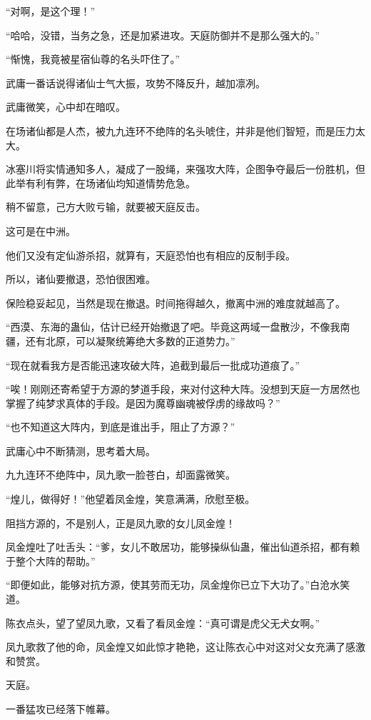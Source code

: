 \begin{this_body}
“对啊，是这个理！”

“哈哈，没错，当务之急，还是加紧进攻。天庭防御并不是那么强大的。”

“惭愧，我竟被星宿仙尊的名头吓住了。”

武庸一番话说得诸仙士气大振，攻势不降反升，越加凛冽。

武庸微笑，心中却在暗叹。

在场诸仙都是人杰，被九九连环不绝阵的名头唬住，并非是他们智短，而是压力太大。

冰塞川将实情通知多人，凝成了一股绳，来强攻大阵，企图争夺最后一份胜机，但此举有利有弊，在场诸仙均知道情势危急。

稍不留意，己方大败亏输，就要被天庭反击。

这可是在中洲。

他们又没有定仙游杀招，就算有，天庭恐怕也有相应的反制手段。

所以，诸仙要撤退，恐怕很困难。

保险稳妥起见，当然是现在撤退。时间拖得越久，撤离中洲的难度就越高了。

“西漠、东海的蛊仙，估计已经开始撤退了吧。毕竟这两域一盘散沙，不像我南疆，还有北原，可以凝聚统筹绝大多数的正道势力。”

“现在就看我方是否能迅速攻破大阵，追截到最后一批成功道痕了。”

“唉！刚刚还寄希望于方源的梦道手段，来对付这种大阵。没想到天庭一方居然也掌握了纯梦求真体的手段。是因为魔尊幽魂被俘虏的缘故吗？”

“也不知道这大阵内，到底是谁出手，阻止了方源？”

武庸心中不断猜测，思考着大局。

九九连环不绝阵中，凤九歌一脸苍白，却面露微笑。

“煌儿，做得好！”他望着凤金煌，笑意满满，欣慰至极。

阻挡方源的，不是别人，正是凤九歌的女儿凤金煌！

凤金煌吐了吐舌头：“爹，女儿不敢居功，能够操纵仙蛊，催出仙道杀招，都有赖于整个大阵的帮助。”

“即便如此，能够对抗方源，使其劳而无功，凤金煌你已立下大功了。”白沧水笑道。

陈衣点头，望了望凤九歌，又看了看凤金煌：“真可谓是虎父无犬女啊。”

凤九歌救了他的命，凤金煌又如此惊才艳艳，这让陈衣心中对这对父女充满了感激和赞赏。

天庭。

一番猛攻已经落下帷幕。


\end{this_body}
